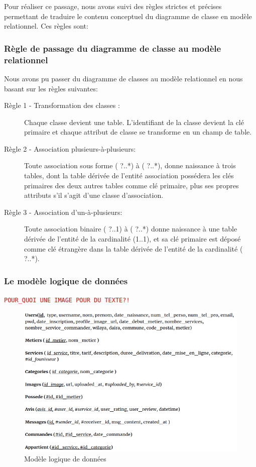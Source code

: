 \documentclass[french]{report}
\newcommand\rmq[1]{\textcolor{red}{\tt #1}}
\begin{document}
Pour réaliser ce passage, nous avons suivi des règles strictes et précises
permettant de traduire le contenu conceptuel du diagramme de classe en modèle
relationnel. Ces règles sont:

\subsubsection{Règle de passage du diagramme de classe au modèle relationnel}

Nous avons pu passer du diagramme de classes au modèle relationnel en nous
basant sur les règles suivantes:

\begin{description}
    \item[Règle 1 - Transformation des classes :] Chaque classe devient une table.
        L'identifiant de la classe devient la clé primaire et chaque attribut de
        classe se transforme en un champ de table.
    
    \item[Règle 2 - Association plusieurs-à-plusieurs:] Toute association sous
        forme ( ?..*) à ( ?..*), donne naissance à trois tables, dont la table
        dérivée de l'entité association possédera les clés primaires des deux
        autres tables comme clé primaire, plus ses propres attributs s'il s'agit
        d'une classe d'association.

    \item[Règle 3 - Association d'un-à-plusieurs:] Toute association binaire (
        ?..1) à ( ?..*) donne naissance à une table dérivée de l'entité de la
        cardinalité (1..1), et sa clé primaire est déposé comme clé étrangère
        dans la table dérivée de l'entité de la cardinalité ( ?..*).
\end{description}

\subsubsection{Le modèle logique de données}

\rmq{POUR\_QUOI UNE IMAGE POUR DU TEXTE?!}

\begin{figure}[H]
\centering
\includegraphics[width=1\textwidth]{images/MLD.png}
\caption{Modèle logique de données}
\label{fig:my_label}
\end{figure}
\end{document}
